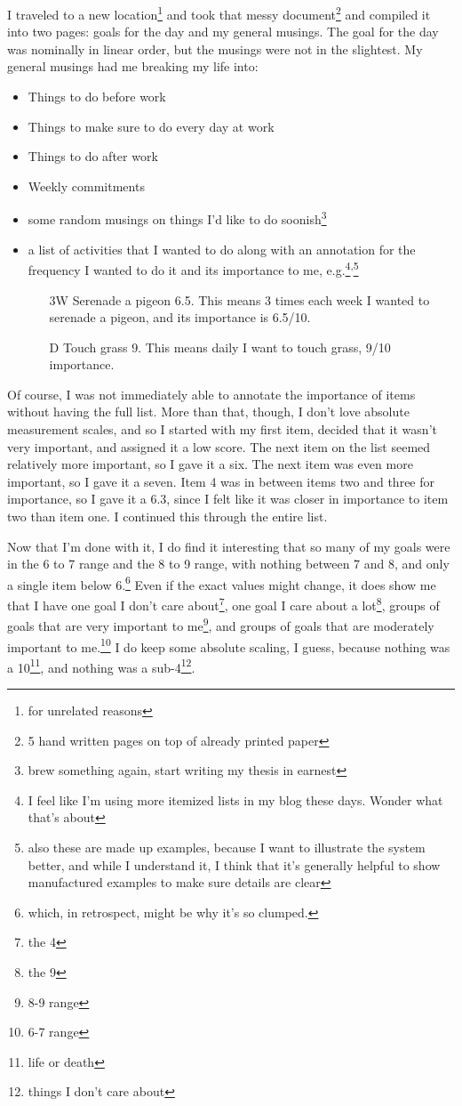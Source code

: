 \documentclass[12pt]{article}[titlepage]
\renewcommand{\,}{\textsuperscript{,}}
\begin{document}
I traveled to a new location\footnote{for unrelated reasons} and took that messy document\footnote{5 hand written pages on top of already printed paper} and compiled it into two pages: goals for the day and my general musings.  
The goal for the day was nominally in linear order, but the musings were not in the slightest.  
My general musings had me breaking my life into:  
\begin{itemize}  
\item Things to do before work  
\item Things to make sure to do every day at work  
\item Things to do after work  
\item Weekly commitments  
\item some random musings on things I'd like to do soonish\footnote{brew something again, start writing my thesis in earnest}  
\item a list of activities that I wanted to do along with an annotation for the frequency I wanted to do it and its importance to me, e.g.\footnote{I feel like I'm using more itemized lists in my blog these days. Wonder what that's about}\textsuperscript{,}\footnote{also these are made up examples, because I want to illustrate the system better, and while I understand it, I think that it's generally helpful to show manufactured examples to make sure details are clear}  
\begin{itemize}  
\item [3W] Serenade a pigeon 6.5. This means 3 times each week I wanted to serenade a pigeon, and its importance is 6.5/10.  
\item [D] Touch grass 9. This means daily I want to touch grass, 9/10 importance.  
\end{itemize}  
\end{itemize}

Of course, I was not immediately able to annotate the importance of items without having the full list.  
More than that, though, I don't love absolute measurement scales, and so I started with my first item, decided that it wasn't very important, and assigned it a low score.  
The next item on the list seemed relatively more important, so I gave it a six.  
The next item was even more important, so I gave it a seven.  
Item 4 was in between items two and three for importance, so I gave it a 6.3, since I felt like it was closer in importance to item two than item one.  
I continued this through the entire list.

Now that I'm done with it, I do find it interesting that so many of my goals were in the 6 to 7 range and the 8 to 9 range, with nothing between 7 and 8, and only a single item below 6.\footnote{which, in retrospect, might be why it's so clumped.}  
Even if the exact values might change, it does show me that I have one goal I don't care about\footnote{the 4}, one goal I care about a lot\footnote{the 9}, groups of goals that are very important to me\footnote{8-9 range}, and groups of goals that are moderately important to me.\footnote{6-7 range}  
I do keep some absolute scaling, I guess, because nothing was a 10\footnote{life or death}, and nothing was a sub-4\footnote{things I don't care about}.  
\end{document}
